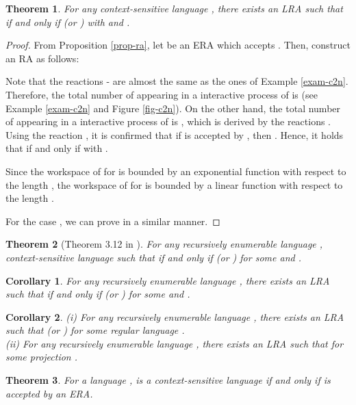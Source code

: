 \documentclass[preprint,fleqn,1p]{elsarticle}
\newtheorem{thm}{Theorem}
\newtheorem{cor}{Corollary}
\begin{document}
\begin{thm}
For any context-sensitive language , there exists an LRA  such that  if and only if  {\rm (}or {\rm )} with  and .
\end{thm}

\begin{proof}
From Proposition \ref{prop-ra}, let  be an ERA which accepts . Then, construct an RA  as follows:


Note that the reactions - are almost the same as the ones of Example \ref{exam-c2n}. Therefore, the total number of  appearing in a interactive process of  is  (see Example \ref{exam-c2n} and Figure \ref{fig-c2n}). 
On the other hand, the total number of  appearing in a interactive process of  is , which is derived by the reactions . Using the reaction , it is confirmed that if  is accepted by , then .
Hence, it holds that  if and only if  with .  

Since the workspace of  for  is bounded by an exponential function with respect to the length , the workspace of  for  is bounded by a linear function with respect to the length .  

For the case , we can prove in a similar manner.
\end{proof}

\begin{thm}[Theorem 3.12 in \cite{PRS:98}]
For any recursively enumerable language , context-sensitive language  such that  if and only if  (or ) for some  and . 
\end{thm}

\begin{cor}
For any recursively enumerable language , there exists an LRA  such that  if and only if  (or ) for some  and . 
\end{cor}

\begin{cor}
(i) For any recursively enumerable language , there exists an LRA  such that  (or ) for some regular language . \\
(ii) For any recursively enumerable language , there exists an LRA  such that  for some projection .
\label{cor-re-lra}
\end{cor}

\begin{thm}
For a language ,  is a context-sensitive language if and only if  is accepted by an ERA.
\end{thm}
\end{document}
